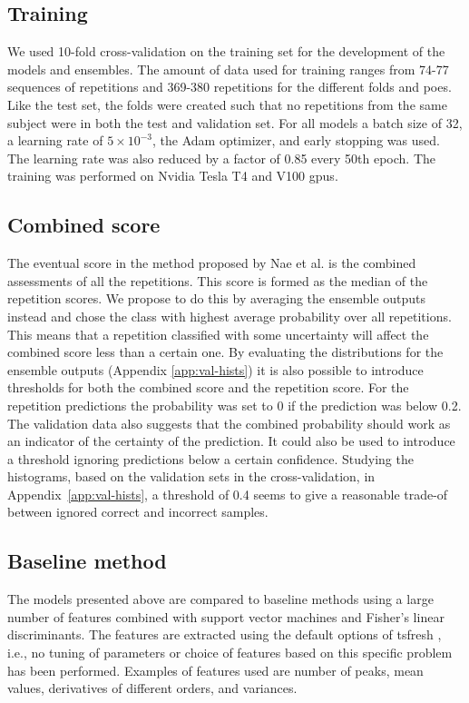 \subsection{Training} \label{sec:met-training}
We used 10-fold cross-validation on the training set for the development of the models and ensembles. The amount of data used for training ranges from 74-77 sequences of repetitions and 369-380 repetitions for the different folds and \glspl{poe}. Like the test set, the folds were created such that no repetitions from the same subject were in both the test and validation set. For all models a batch size of 32, a learning rate of $5 \times 10^{-3}$, the Adam optimizer, and early stopping was used. The learning rate was also reduced by a factor of 0.85 every 50th epoch. The training was performed on Nvidia Tesla T4 and V100 \glspl{gpu}.


\subsection{Combined score} \label{sec:met-combined}
The eventual score in the method proposed by Nae et al. \cite{Nae2020b} is the combined assessments of all the repetitions. This score is formed as the median of the repetition scores. We propose to do this by averaging the ensemble outputs instead and chose the class with highest average probability over all repetitions. This means that a repetition classified with some uncertainty will affect the combined score less than a certain one. By evaluating the distributions for the ensemble outputs (Appendix \ref{app:val-hists}) it is also possible to introduce thresholds for both the combined score and the repetition score. For the repetition predictions the probability was set to 0 if the prediction was below 0.2. The validation data also suggests that the combined probability should work as an indicator of the certainty of the prediction. It could also be used to introduce a threshold ignoring predictions below a certain confidence. Studying the histograms, based on the validation sets in the cross-validation, in Appendix~\ref{app:val-hists}, a threshold of 0.4 seems to give a reasonable trade-of between ignored correct and incorrect samples.


\subsection{Baseline method} \label{sec:met-baseline}
The models presented above are compared to baseline methods using a large number of features combined with support vector machines and Fisher's linear discriminants. The features are extracted using the default options of tsfresh \cite{tsfresh}, i.e., no tuning of parameters or choice of features based on this specific problem has been performed. Examples of features used are number of peaks, mean values, derivatives of different orders, and variances.
